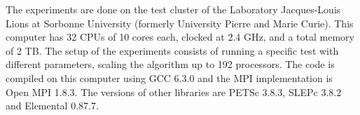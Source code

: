 The experiments are done on the test cluster of the Laboratory Jacques-Louis Lions at Sorbonne University (formerly University Pierre and Marie Curie).
This computer has 32 CPUs of 10 cores each, clocked at 2.4 GHz, and a total memory of 2 TB.
The setup of the experiments consists of running a specific test with different parameters, scaling the algorithm up to 192 processors.
The code is compiled on this computer using GCC 6.3.0 and the MPI implementation is Open MPI 1.8.3.
The versions of other libraries are PETSc 3.8.3, SLEPc 3.8.2 and Elemental 0.87.7.
